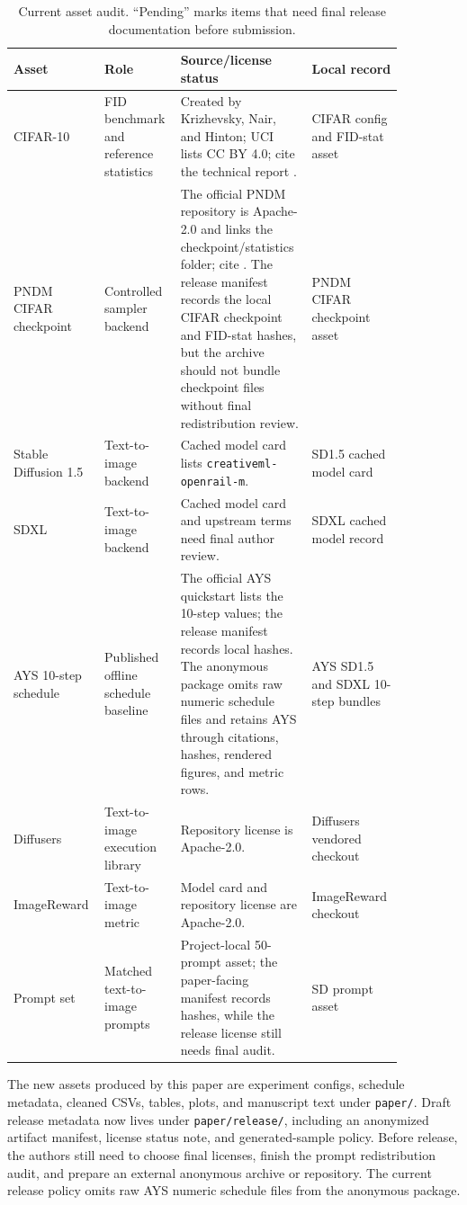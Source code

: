 \begin{table}[t]
\centering
\caption{Current asset audit. ``Pending'' marks items that need final release
documentation before submission.}
\label{tab:asset-audit}
\scriptsize
\setlength{\tabcolsep}{3pt}
\begin{tabular}{p{0.18\linewidth}p{0.16\linewidth}p{0.30\linewidth}p{0.22\linewidth}}
\toprule
Asset & Role & Source/license status & Local record \\
\midrule
CIFAR-10 & FID benchmark and reference statistics &
Created by Krizhevsky, Nair, and Hinton; UCI lists CC BY 4.0; cite the
technical report \citep{krizhevsky2009learning}. &
CIFAR config and FID-stat asset \\
PNDM CIFAR checkpoint & Controlled sampler backend &
The official PNDM repository is Apache-2.0 and links the checkpoint/statistics
folder; cite \citet{liu2022pndm}. The release manifest records the local CIFAR
checkpoint and FID-stat hashes, but the archive should not bundle checkpoint
files without final redistribution review. &
PNDM CIFAR checkpoint asset \\
Stable Diffusion 1.5 & Text-to-image backend &
Cached model card lists \texttt{creativeml-openrail-m}. &
SD1.5 cached model card \\
SDXL & Text-to-image backend &
Cached model card and upstream terms need final author review. &
SDXL cached model record \\
AYS 10-step schedule & Published offline schedule baseline &
The official AYS quickstart lists the 10-step values; the release manifest
records local hashes. The anonymous package omits raw numeric schedule files
and retains AYS through citations, hashes, rendered figures, and metric rows. &
AYS SD1.5 and SDXL 10-step bundles \\
Diffusers & Text-to-image execution library &
Repository license is Apache-2.0. &
Diffusers vendored checkout \\
ImageReward & Text-to-image metric &
Model card and repository license are Apache-2.0. &
ImageReward checkout \\
Prompt set & Matched text-to-image prompts &
Project-local 50-prompt asset; the paper-facing manifest records hashes, while
the release license still needs final audit. &
SD prompt asset \\
\bottomrule
\end{tabular}
\end{table}

The new assets produced by this paper are experiment configs, schedule
metadata, cleaned CSVs, tables, plots, and manuscript text under
\texttt{paper/}. Draft release metadata now lives under
\texttt{paper/release/}, including an anonymized artifact manifest, license
status note, and generated-sample policy. Before release, the authors still
need to choose final licenses, finish the prompt redistribution audit, and
prepare an external anonymous archive or repository. The current release policy
omits raw AYS numeric schedule files from the anonymous package.
